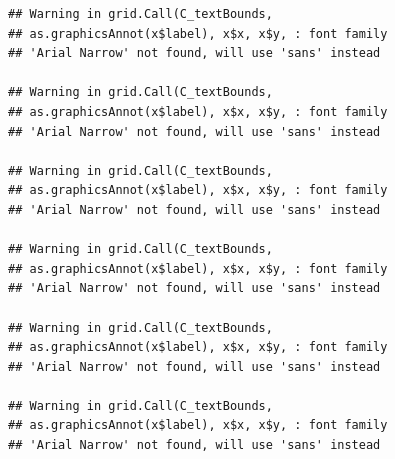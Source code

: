 \documentclass[]{krantz}
\begin{document}
\begin{verbatim}
## Warning in grid.Call(C_textBounds,
## as.graphicsAnnot(x$label), x$x, x$y, : font family
## 'Arial Narrow' not found, will use 'sans' instead

## Warning in grid.Call(C_textBounds,
## as.graphicsAnnot(x$label), x$x, x$y, : font family
## 'Arial Narrow' not found, will use 'sans' instead

## Warning in grid.Call(C_textBounds,
## as.graphicsAnnot(x$label), x$x, x$y, : font family
## 'Arial Narrow' not found, will use 'sans' instead

## Warning in grid.Call(C_textBounds,
## as.graphicsAnnot(x$label), x$x, x$y, : font family
## 'Arial Narrow' not found, will use 'sans' instead

## Warning in grid.Call(C_textBounds,
## as.graphicsAnnot(x$label), x$x, x$y, : font family
## 'Arial Narrow' not found, will use 'sans' instead

## Warning in grid.Call(C_textBounds,
## as.graphicsAnnot(x$label), x$x, x$y, : font family
## 'Arial Narrow' not found, will use 'sans' instead
\end{verbatim}
\end{document}
